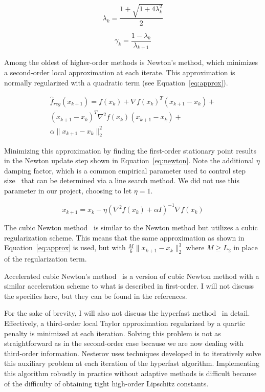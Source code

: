 \documentclass[journal]{IEEEtran}
\begin{document}
\begin{equation}
    \lambda_{k} = \frac{1 + \sqrt{1 + 4\lambda_k^2}}{2}
    \label{eq:acc_gd2}
\end{equation}

\begin{equation}
    \gamma_k = \frac{1 - \lambda_k}{\lambda_{k+1}}
    \label{eq:acc_gd3}
\end{equation}

Among the oldest of higher-order methods is Newton's method, which minimizes a second-order local approximation at each iterate. This approximation is normally regularized with a quadratic term (see Equation~\ref{eq:approx}).

\begin{equation}
    \begin{split}
    \hat{f}_{reg}(x_{k+1}) = f(x_k) + \nabla f(x_k)^T (x_{k+1} - x_k) + \\ (x_{k+1} - x_k)^T \nabla^2 f(x_k) (x_{k+1} - x_k) +\\  \alpha \|x_{k+1} - x_k\|_2^2
    \end{split}
    \label{eq:approx}
\end{equation}

Minimizing this approximation by finding the first-order stationary point results in the Newton update step shown in Equation~\ref{eq:newton}. Note the additional $\eta$ damping factor, which is a common empirical parameter used to control step size~\cite{cmu} that can be determined via a line search method. We did not use this parameter in our project, choosing to let $\eta=1$.

\begin{equation}
    x_{k+1} = x_k - \eta (\nabla^2 f(x_k) + \alpha I)^{-1} \nabla f(x_k)
    \label{eq:newton}
\end{equation}

The cubic Newton method~\cite{Nesterov2006} is similar to the Newton method but utilizes a cubic regularization scheme. This means that the same approximation as shown in Equation~\ref{eq:approx} is used, but with $\frac{M}{6} \|x_{k+1} - x_k\|_2^3$ where $M \ge L_2$ in place of the regularization term.

Accelerated cubic Newton's method~\cite{AccNesterov2007} is a version of cubic Newton method with a similar acceleration scheme to what is described in first-order. I will not discuss the specifics here, but they can be found in the references.

For the sake of brevity, I will also not discuss the hyperfast method~\cite{Nesterov2019} in detail. Effectively, a third-order local Taylor approximation regularized by a quartic penalty is minimized at each iteration. Solving this problem is not as straightforward as in the second-order case because we are now dealing with third-order information. Nesterov uses techniques developed in \cite{lu2017relativelysmooth} to iteratively solve this auxiliary problem at each iteration of the hyperfast algorithm. Implementing this algorithm robustly in practice without adaptive methods is difficult because of the difficulty of obtaining tight high-order Lipschitz constants.
\end{document}
